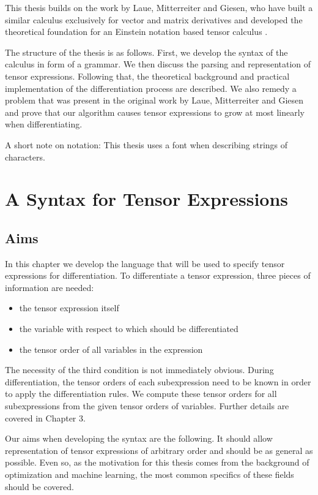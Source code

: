 \documentclass[12pt, a4paper]{report}
\begin{document}
This thesis builds on the work by Laue, Mitterreiter and Giesen, who have built a similar calculus exclusively for vector and matrix derivatives \cite{matrixpaper} and developed the theoretical foundation for an Einstein notation based tensor calculus \cite{tensorpaper}.

The structure of the thesis is as follows.
First, we develop the syntax of the calculus in form of a grammar.
We then discuss the parsing and representation of tensor expressions.
Following that, the theoretical background and practical implementation of the differentiation process are described.
We also remedy a problem that was present in the original work \cite{tensorpaper} by Laue, Mitterreiter and Giesen and prove that our algorithm causes tensor expressions to grow at most linearly when differentiating.

A short note on notation: This thesis uses a  font when describing strings of characters.

\chapter{A Syntax for Tensor Expressions}
\section{Aims}
In this chapter we develop the language that will be used to specify tensor expressions for differentiation.
To differentiate a tensor expression, three pieces of information are needed: 
\begin{itemize}
    \item the tensor expression itself
    \item the variable with respect to which should be differentiated
    \item the tensor order of all variables in the expression
\end{itemize}
The necessity of the third condition is not immediately obvious.
During differentiation, the tensor orders of each subexpression need to be known in order to apply the differentiation rules.
We compute these tensor orders for all subexpressions from the given tensor orders of variables.
Further details are covered in Chapter 3.

Our aims when developing the syntax are the following.
It should allow representation of tensor expressions of arbitrary order and should be as general as possible.
Even so, as the motivation for this thesis comes from the background of optimization and machine learning, the most common specifics of these fields should be covered.
\end{document}
